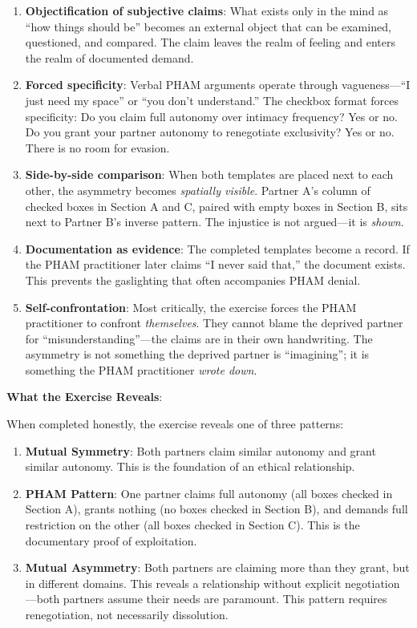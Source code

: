 \documentclass[12pt,openany]{book}
\numberwithin{equation}{chapter}
\begin{document}
\begin{enumerate}
    \item \textbf{Objectification of subjective claims}: What exists only in the mind as ``how things should be'' becomes an external object that can be examined, questioned, and compared. The claim leaves the realm of feeling and enters the realm of documented demand.
    
    \item \textbf{Forced specificity}: Verbal PHAM arguments operate through vagueness---``I just need my space'' or ``you don't understand.'' The checkbox format forces specificity: Do you claim full autonomy over intimacy frequency? Yes or no. Do you grant your partner autonomy to renegotiate exclusivity? Yes or no. There is no room for evasion.
    
    \item \textbf{Side-by-side comparison}: When both templates are placed next to each other, the asymmetry becomes \textit{spatially visible}. Partner A's column of checked boxes in Section A and C, paired with empty boxes in Section B, sits next to Partner B's inverse pattern. The injustice is not argued---it is \textit{shown}.
    
    \item \textbf{Documentation as evidence}: The completed templates become a record. If the PHAM practitioner later claims ``I never said that,'' the document exists. This prevents the gaslighting that often accompanies PHAM denial.
    
    \item \textbf{Self-confrontation}: Most critically, the exercise forces the PHAM practitioner to confront \textit{themselves}. They cannot blame the deprived partner for ``misunderstanding''---the claims are in their own handwriting. The asymmetry is not something the deprived partner is ``imagining''; it is something the PHAM practitioner \textit{wrote down}.
\end{enumerate}

\textbf{What the Exercise Reveals}:

When completed honestly, the exercise reveals one of three patterns:

\begin{enumerate}
    \item \textbf{Mutual Symmetry}: Both partners claim similar autonomy and grant similar autonomy. This is the foundation of an ethical relationship.
    
    \item \textbf{PHAM Pattern}: One partner claims full autonomy (all boxes checked in Section A), grants nothing (no boxes checked in Section B), and demands full restriction on the other (all boxes checked in Section C). This is the documentary proof of exploitation.
    
    \item \textbf{Mutual Asymmetry}: Both partners are claiming more than they grant, but in different domains. This reveals a relationship without explicit negotiation---both partners assume their needs are paramount. This pattern requires renegotiation, not necessarily dissolution.
\end{enumerate}
\end{document}
